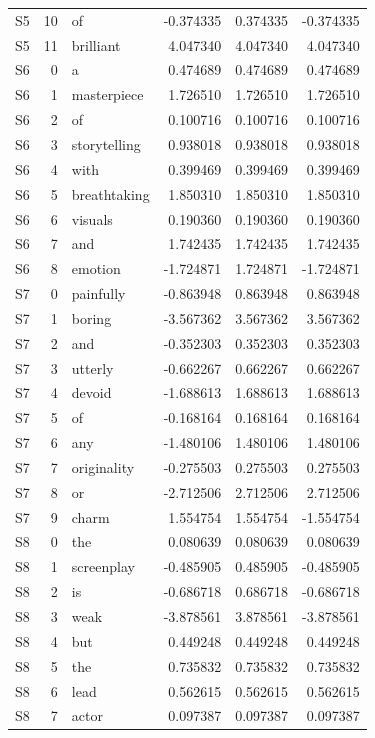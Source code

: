 \begin{longtable}{@{}lrlrrr@{}}
S5 & 10 & of & -0.374335 & 0.374335 & -0.374335 \\
S5 & 11 & brilliant & 4.047340 & 4.047340 & 4.047340 \\
S6 & 0 & a & 0.474689 & 0.474689 & 0.474689 \\
S6 & 1 & masterpiece & 1.726510 & 1.726510 & 1.726510 \\
S6 & 2 & of & 0.100716 & 0.100716 & 0.100716 \\
S6 & 3 & storytelling & 0.938018 & 0.938018 & 0.938018 \\
S6 & 4 & with & 0.399469 & 0.399469 & 0.399469 \\
S6 & 5 & breathtaking & 1.850310 & 1.850310 & 1.850310 \\
S6 & 6 & visuals & 0.190360 & 0.190360 & 0.190360 \\
S6 & 7 & and & 1.742435 & 1.742435 & 1.742435 \\
S6 & 8 & emotion & -1.724871 & 1.724871 & -1.724871 \\
S7 & 0 & painfully & -0.863948 & 0.863948 & 0.863948 \\
S7 & 1 & boring & -3.567362 & 3.567362 & 3.567362 \\
S7 & 2 & and & -0.352303 & 0.352303 & 0.352303 \\
S7 & 3 & utterly & -0.662267 & 0.662267 & 0.662267 \\
S7 & 4 & devoid & -1.688613 & 1.688613 & 1.688613 \\
S7 & 5 & of & -0.168164 & 0.168164 & 0.168164 \\
S7 & 6 & any & -1.480106 & 1.480106 & 1.480106 \\
S7 & 7 & originality & -0.275503 & 0.275503 & 0.275503 \\
S7 & 8 & or & -2.712506 & 2.712506 & 2.712506 \\
S7 & 9 & charm & 1.554754 & 1.554754 & -1.554754 \\
S8 & 0 & the & 0.080639 & 0.080639 & 0.080639 \\
S8 & 1 & screenplay & -0.485905 & 0.485905 & -0.485905 \\
S8 & 2 & is & -0.686718 & 0.686718 & -0.686718 \\
S8 & 3 & weak & -3.878561 & 3.878561 & -3.878561 \\
S8 & 4 & but & 0.449248 & 0.449248 & 0.449248 \\
S8 & 5 & the & 0.735832 & 0.735832 & 0.735832 \\
S8 & 6 & lead & 0.562615 & 0.562615 & 0.562615 \\
S8 & 7 & actor & 0.097387 & 0.097387 & 0.097387 \\

\end{longtable}
